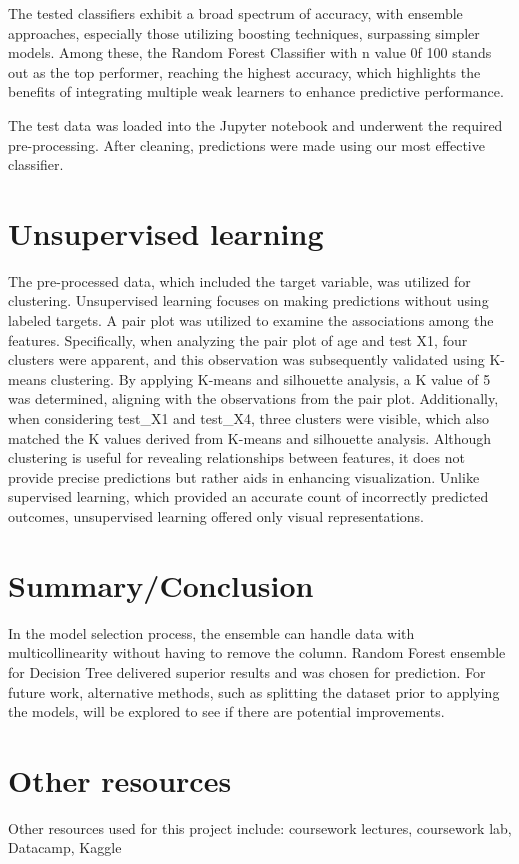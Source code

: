 \documentclass[a4paper]{article}
\begin{document}
The tested classifiers exhibit a broad spectrum of accuracy, with ensemble approaches, especially those utilizing boosting techniques, surpassing simpler models. Among these, the Random Forest Classifier with n value 0f 100 stands out as the top performer, reaching the highest accuracy, which highlights the benefits of integrating multiple weak learners to enhance predictive performance.

The test data was loaded into the Jupyter notebook and underwent the required pre-processing. After cleaning, predictions were made using our most effective classifier.
\section{Unsupervised learning}
The pre-processed data, which included the target variable, was utilized for clustering. Unsupervised learning focuses on making predictions without using labeled targets. A pair plot was utilized to examine the associations among the features. Specifically, when analyzing the pair plot of age and test X1, four clusters were apparent, and this observation was subsequently validated using K-means clustering. By applying K-means and silhouette analysis, a K value of 5 was determined, aligning with the observations from the pair plot. Additionally, when considering test\_X1 and test\_X4, three clusters were visible, which also matched the K values derived from K-means and silhouette analysis. Although clustering is useful for revealing relationships between features, it does not provide precise predictions but rather aids in enhancing visualization. Unlike supervised learning, which provided an accurate count of incorrectly predicted outcomes, unsupervised learning offered only visual representations.


\section{Summary/Conclusion}
In the model selection process, the ensemble can handle data with multicollinearity without having to remove the column. Random Forest ensemble for Decision Tree delivered superior results and was chosen for prediction. For future work, alternative methods, such as splitting the dataset prior to applying the models, will be explored to see if there are potential improvements. 

\section{Other resources}
Other resources used for this project include: coursework lectures, coursework lab, Datacamp, Kaggle





\end{document}
